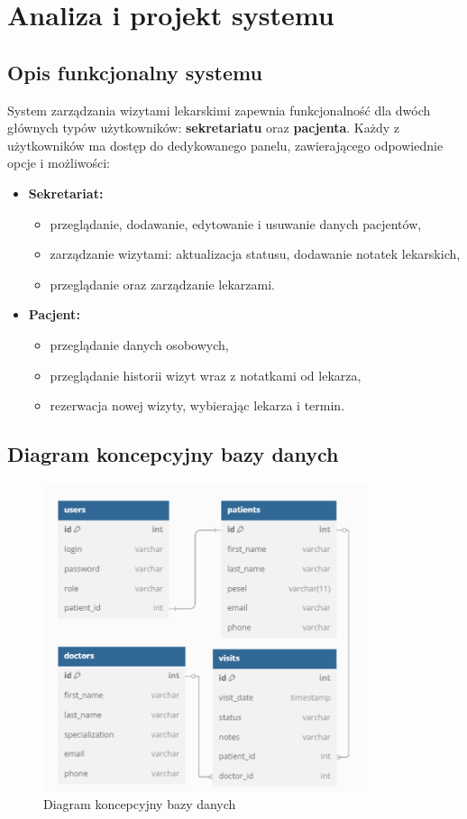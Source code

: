 \chapter{Analiza i projekt systemu}

\section{Opis funkcjonalny systemu}
System zarządzania wizytami lekarskimi zapewnia funkcjonalność dla dwóch głównych typów użytkowników: \textbf{sekretariatu} oraz \textbf{pacjenta}. Każdy z użytkowników ma dostęp do dedykowanego panelu, zawierającego odpowiednie opcje i możliwości:

\begin{itemize}
  \item \textbf{Sekretariat:}
  \begin{itemize}
    \item przeglądanie, dodawanie, edytowanie i usuwanie danych pacjentów,
    \item zarządzanie wizytami: aktualizacja statusu, dodawanie notatek lekarskich,
    \item przeglądanie oraz zarządzanie lekarzami.
  \end{itemize}

  \item \textbf{Pacjent:}
  \begin{itemize}
    \item przeglądanie danych osobowych,
    \item przeglądanie historii wizyt wraz z notatkami od lekarza,
    \item rezerwacja nowej wizyty, wybierając lekarza i termin.
  \end{itemize}
\end{itemize}

\section{Diagram koncepcyjny bazy danych}
\begin{figure}[H]
\centering
\includegraphics[width=0.85\textwidth]{figures/Diagram_bazy_danych.png}
\caption{Diagram koncepcyjny bazy danych}
\end{figure}

